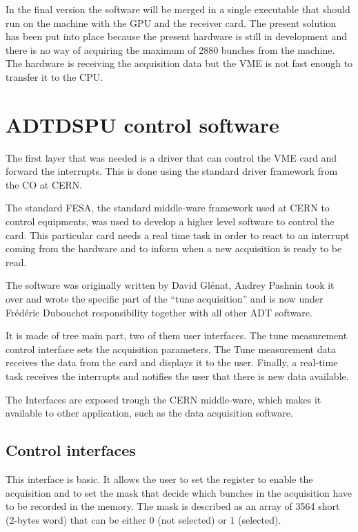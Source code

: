 In the final version the software will be merged in a single executable that should run on the machine with the \gls{GPU} and the receiver card. The present solution has been put into place because the present hardware is still in development and there is no way of acquiring the maximum of 2880 bunches from the machine. The hardware is receiving the acquisition data but the \gls{VME} is not fast enough to transfer it to the \gls{CPU}.

\section{ADTDSPU control software}

The first layer that was needed is a driver that can control the \gls{VME} card and forward the interrupts. This is done using the standard driver framework from the \gls{CO} at \gls{CERN}.

The standard \gls{FESA}, the standard middle-ware framework used at \gls{CERN} to control equipments, was used to develop a higher level software to control the card. This particular card needs a real time task in order to react to an interrupt coming from the hardware and to inform when a new acquisition is ready to be read.

The software was originally written by David Gl{\'e}nat, Andrey
Pashnin took it over and wrote the specific part of the ``tune
acquisition'' and is now under Fr{\'e}d{\'e}ric Dubouchet
responsibility together with all other \gls{ADT} software.

It is made of tree main part, two of them user interfaces. The tune
measurement control interface sets the acquisition parameters. The
Tune measurement data receives the data from the card and displays it
to the user. Finally, a real-time task receives the interrupts and
notifies the user that there is new data available.

The Interfaces are exposed trough the \gls{CERN} middle-ware, which
makes it available to other application, such as the data acquisition
software.

\subsection{Control interfaces}

This interface is basic. It allows the user to set the register to
enable the acquisition and to set the mask that decide which bunches
in the acquisition have to be recorded in the memory. The mask is
described as an array of 3564 short (2-bytes word) that can be either
0 (not selected) or 1 (selected).

